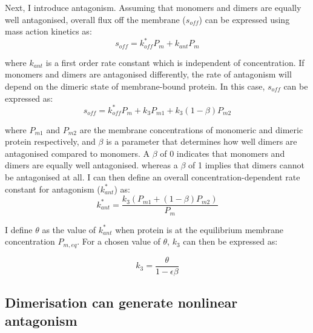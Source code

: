 \documentclass[12pt]{"report"}
\begin{document}

Next, I introduce antagonism. Assuming that monomers and dimers are equally well antagonised, overall flux off the membrane ($s_{off}$) can be expressed using mass action kinetics as:
\begin{equation}
s_{off} = k_{off}^* P_m + k_{ant} P_m
\end{equation} 

where $k_{ant}$ is a first order rate constant which is independent of concentration. If monomers and dimers are antagonised differently, the rate of antagonism will depend on the dimeric state of membrane-bound protein. In this case, $s_{off}$ can be expressed as:
\begin{equation}
s_{off} = k_{off}^* P_m + k_3 P_{m1} + k_3 (1 - \beta) P_{m2}
\end{equation} 

where $P_{m1}$ and $P_{m2}$ are the membrane concentrations of monomeric and dimeric protein respectively, and $\beta$ is a parameter that determines how well dimers are antagonised compared to monomers. A $\beta$ of 0 indicates that monomers and dimers are equally well antagonised. whereas a $\beta$ of 1 implies that dimers cannot be antagonised at all. I can then define an overall concentration-dependent rate constant for antagonism ($k_{ant}^*$) as:
\begin{equation}
k_{ant}^* = \frac{k_3 (P_{m1} + (1 - \beta) P_{m2})}{P_{m}}
\end{equation} 

I define $\theta$ as the value of $k_{ant}^*$ when protein is at the equilibrium membrane concentration $P_{m,eq}$. For a chosen value of $\theta$, $k_3$ can then be expressed as:

\begin{equation}
k_3 = \frac{\theta}{1 - \epsilon\beta}
\end{equation}

\clearpage
\subsection{Dimerisation can generate nonlinear antagonism}
\end{document}
